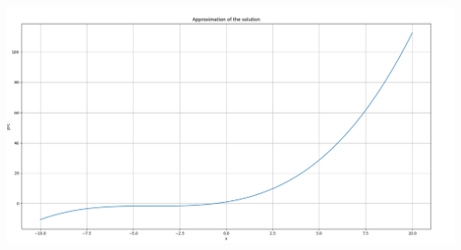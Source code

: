 \documentclass{article}
\begin{document}
\includegraphics[width=\textwidth,height=10cm,keepaspectratio]{Approx.png}
\end{document}
